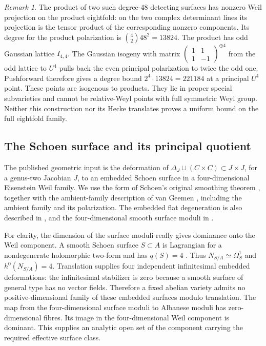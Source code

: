 \documentclass[11pt]{article}
\theoremstyle{definition}
\theoremstyle{remark}
\newtheorem{remark}[theorem]{Remark}
\begin{document}
\begin{remark}\label{rem:cyclic-four-eightfold-seed}
The product of two such degree-$48$ detecting surfaces has nonzero
Weil projection on the product eightfold: on the two complex determinant
lines its projection is the tensor product of the corresponding nonzero
components.  Its degree for the product polarization is
$\binom42 48^2=13824$.  The product has odd Gaussian lattice
$I_{4,4}$.  The Gaussian isogeny with matrix
$\left(\begin{smallmatrix}1&1\\1&-1\end{smallmatrix}\right)^{\oplus4}$
from the odd lattice to $U^4$ pulls back the even principal polarization
to twice the odd one.  Pushforward therefore gives a degree bound
$2^4\cdot13824=221184$ at a principal $U^4$ point.  These points are
isogenous to products.  They lie in proper special subvarieties and
cannot be relative-Weyl points with full symmetric Weyl group.
Neither this construction nor its Hecke translates proves a uniform
bound on the full eightfold family.
\end{remark}

\subsection{The Schoen surface and its principal quotient}

The published geometric input is the deformation of
$\Delta_J\cup(C\times C)\subset J\times J$, for a genus-two Jacobian $J$, to an embedded Schoen surface in a four-dimensional Eisenstein Weil family. We use the form of Schoen's original smoothing theorem \cite[Theorem~1.1(i)--(iii), p.~585]{Schoen07}, together with the ambient-family description of van Geemen \cite[Introduction, p.~1, and \S6.2, pp.~14--15]{vG22}, including the ambient family and its polarization. The embedded flat degeneration is also described in \cite[\S3, pp.~5--6]{Beauville}, and the four-dimensional smooth surface moduli in \cite[Theorem~1]{RRS}.

For clarity, the dimension of the surface moduli really gives dominance onto the Weil component. A smooth Schoen surface $S\subset A$ is Lagrangian for a nondegenerate holomorphic two-form and has $q(S)=4$ \cite[Introduction]{RRS}. Thus $N_{S/A}\simeq\Omega_S^1$ and $h^0(N_{S/A})=4$. Translation supplies four independent infinitesimal embedded deformations: the infinitesimal stabilizer is zero because a smooth surface of general type has no vector fields. Therefore a fixed abelian variety admits no positive-dimensional family of these embedded surfaces modulo translation. The map from the four-dimensional surface moduli to Albanese moduli has zero-dimensional fibres. Its image in the four-dimensional Weil component is dominant. This supplies an analytic open set of the component carrying the required effective surface class.
\end{document}
